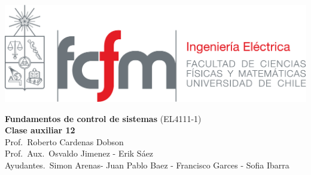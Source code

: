 \documentclass[
  11pt,
  letterpaper,
   addpoints,
   answers
  ]{exam}
\begin{document}
\noindent
\begin{minipage}{0.47\textwidth}
\includegraphics[width=\textwidth]{../fcfm_die}
\end{minipage}
\begin{minipage}{0.53\textwidth}
\begin{center} 
\large\textbf{Fundamentos de control de sistemas} (EL4111-1) \\
\large\textbf{Clase auxiliar 12} \\
\small Prof.~Roberto Cardenas Dobson\\
\small Prof.~Aux.~Osvaldo Jimenez - Erik Sáez\\
\small Ayudantes.~Simon Arenas- Juan Pablo Baez - Francisco Garces - Sofia Ibarra\\
\end{center}
\end{minipage}

\vspace{0.5cm}
\noindent
\vspace{.85cm}
\end{document}
